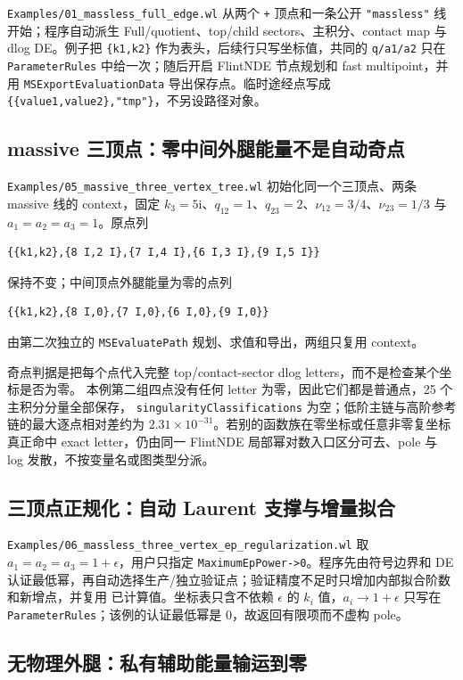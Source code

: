 \documentclass[11pt,a4paper]{ctexart}
\newcommand{\ii}{\mathrm i}
\begin{document}
\texttt{Examples/01\_massless\_full\_edge.wl} 从两个 \texttt{+} 顶点和一条公开
\texttt{"massless"} 线开始；程序自动派生 Full/quotient、top/child sectors、主积分、contact
map 与 dlog DE。例子把 \texttt{\{k1,k2\}} 作为表头，后续行只写坐标值，共同的
\texttt{q/a1/a2} 只在 \texttt{ParameterRules} 中给一次；随后开启 FlintNDE 节点规划和 fast
multipoint，并用 \texttt{MSExportEvaluationData} 导出保存点。临时途经点写成
\texttt{\{\{value1,value2\},"tmp"\}}，不另设路径对象。

\subsection{massive 三顶点：零中间外腿能量不是自动奇点}

\texttt{Examples/05\_massive\_three\_vertex\_tree.wl} 初始化同一个三顶点、两条 massive 线的
context，固定 $k_3=5\ii$、$q_{12}=1$、$q_{23}=2$、$\nu_{12}=3/4$、$\nu_{23}=1/3$ 与
$a_1=a_2=a_3=1$。原点列
\begin{verbatim}
{{k1,k2},{8 I,2 I},{7 I,4 I},{6 I,3 I},{9 I,5 I}}
\end{verbatim}
保持不变；中间顶点外腿能量为零的点列
\begin{verbatim}
{{k1,k2},{8 I,0},{7 I,0},{6 I,0},{9 I,0}}
\end{verbatim}
由第二次独立的 \texttt{MSEvaluatePath} 规划、求值和导出，两组只复用 context。

奇点判据是把每个点代入完整 top/contact-sector dlog letters，而不是检查某个坐标是否为零。
本例第二组四点没有任何 letter 为零，因此它们都是普通点，25 个主积分分量全部保存，
\texttt{singularityClassifications} 为空；低阶主链与高阶参考链的最大逐点相对差约为
$2.31\times10^{-31}$。若别的函数族在零坐标或任意非零复坐标真正命中 exact letter，仍由同一
FlintNDE 局部幂对数入口区分可去、pole 与 log 发散，不按变量名或图类型分派。

\subsection{三顶点正规化：自动 Laurent 支撑与增量拟合}

\texttt{Examples/06\_massless\_three\_vertex\_ep\_regularization.wl} 取
$a_1=a_2=a_3=1+\epsilon$，用户只指定 \texttt{MaximumEpPower->0}。程序先由符号边界和 DE
认证最低幂，再自动选择生产/独立验证点；验证精度不足时只增加内部拟合阶数和新增点，并复用
已计算值。坐标表只含不依赖 $\epsilon$ 的 $k_i$ 值，$a_i\to1+\epsilon$ 只写在
\texttt{ParameterRules}；该例的认证最低幂是 0，故返回有限项而不虚构 pole。

\subsection{无物理外腿：私有辅助能量输运到零}
\end{document}

